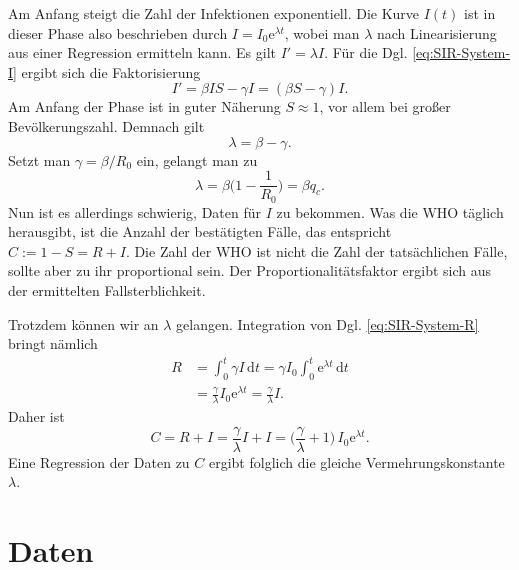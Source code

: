 \documentclass[a4paper,11pt,fleqn,twocolumn,twoside,dvipdfmx]{scrartcl}
\numberwithin{equation}{section}
\newcommand{\ee}{\mathrm e}
\begin{document}
Am Anfang steigt die Zahl der Infektionen exponentiell. Die Kurve
$I(t)$ ist in dieser Phase also beschrieben durch
$I=I_0\ee^{\lambda t}$, wobei man $\lambda$ nach Linearisierung aus
einer Regression ermitteln kann. Es gilt $I'=\lambda I$. Für die
Dgl. \eqref{eq:SIR-System-I} ergibt sich die Faktorisierung%
\begin{equation}
I' = \beta IS-\gamma I = (\beta S-\gamma)I.
\end{equation}
Am Anfang der Phase ist in guter Näherung $S\approx 1$, vor allem bei
großer Bevölkerungszahl. Demnach gilt%
\begin{equation}
\lambda = \beta-\gamma.
\end{equation}
Setzt man $\gamma=\beta/R_0$ ein, gelangt man zu
\begin{equation}
\lambda = \beta\Big(1-\frac{1}{R_0}\Big) = \beta q_c.
\end{equation}
Nun ist es allerdings schwierig, Daten für $I$ zu bekommen. Was die
WHO täglich herausgibt, ist die Anzahl der bestätigten Fälle, das
entspricht $C:=1-S=R+I$. Die Zahl der WHO ist nicht die Zahl der
tatsächlichen Fälle, sollte aber zu ihr proportional sein. Der
Proportionalitätsfaktor ergibt sich aus der ermittelten
Fallsterblichkeit.

Trotzdem können wir an $\lambda$ gelangen. Integration von Dgl.
\eqref{eq:SIR-System-R} bringt nämlich
\begin{align}
R &= \int_0^t \gamma I\,\mathrm dt
= \gamma I_0 \int_0^t \ee^{\lambda t}\,\mathrm dt\\
&= \frac{\gamma}{\lambda} I_0\ee^{\lambda t} = \frac{\gamma}{\lambda} I.
\end{align}
Daher ist
\begin{equation}
C = R+I = \frac{\gamma}{\lambda} I+I
= \Big(\frac{\gamma}{\lambda}+1\Big)\,I_0\ee^{\lambda t}.
\end{equation}
Eine Regression der Daten zu $C$ ergibt folglich die gleiche
Vermehrungskonstante $\lambda$.

\newpage
\section{Daten}
\end{document}
